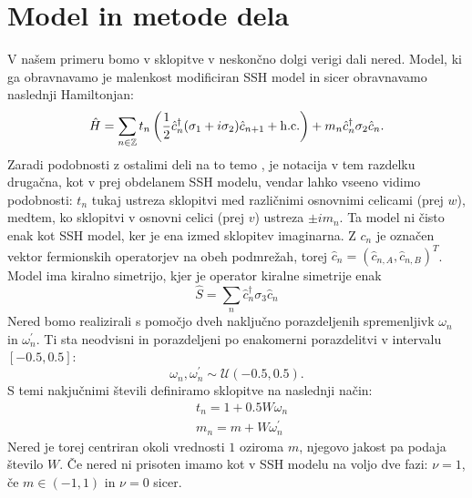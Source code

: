 \chapter{Model in metode dela}
V našem primeru bomo v sklopitve v neskončno dolgi verigi dali nered. Model, ki ga obravnavamo je malenkost modificiran SSH model in sicer obravnavamo naslednji Hamiltonjan:
\begin{equation}
\hat{H} = \sum_{n \in \mathbb{Z}} t_n \left( \frac{1}{2} \hat{c}_n^\dagger (\sigma_1 + i \sigma_2) \hat{c}_{n+1} + \textup{h.c.} \right) + m_n \hat{c}_n^\dagger \sigma_2 \hat{c}_n.
\end{equation}
Zaradi podobnosti z ostalimi deli na to temo \cite{mondragon}, je notacija v tem razdelku drugačna, kot v prej obdelanem SSH modelu, vendar lahko vseeno vidimo podobnosti: $t_n$ tukaj ustreza sklopitvi med različnimi osnovnimi celicami (prej $w$), medtem, ko sklopitvi v osnovni celici (prej $v$) ustreza $\pm i m_n$. Ta model ni čisto enak kot SSH model, ker je ena izmed sklopitev imaginarna. Z $c_n$ je označen vektor fermionskih operatorjev na obeh podmrežah, torej
$\hat{c}_n = (\hat{c}_{n,A} , \hat{c}_{n,B})^T$.
Model ima kiralno simetrijo, kjer je operator kiralne simetrije enak
\begin{equation}
\hat{S} = \sum_n \hat{c}_n^\dagger \sigma_3 \hat{c}_n
\end{equation}
Nered bomo realizirali s pomočjo dveh naključno porazdeljenih spremenljivk $\omega_n$ in $\omega_n^\prime$. Ti sta neodvisni in porazdeljeni po enakomerni porazdelitvi v intervalu $[ -0.5 , 0.5]$:
\begin{equation}
\omega_n, \omega_n^\prime \sim \mathcal{U}(-0.5,0.5).
\end{equation}
S temi nakjučnimi števili definiramo sklopitve na naslednji način:
\begin{align}
&t_n = 1 + 0.5 W \omega_n \\
&m_n = m + W \omega_n^\prime
\end{align}
Nered je torej centriran okoli vrednosti $1$ oziroma $m$, njegovo jakost pa podaja število $W$.
Če nered ni prisoten imamo kot v SSH modelu na voljo dve fazi: $\nu=1$, če $m \in (-1,1)$ in $\nu=0$ sicer.

